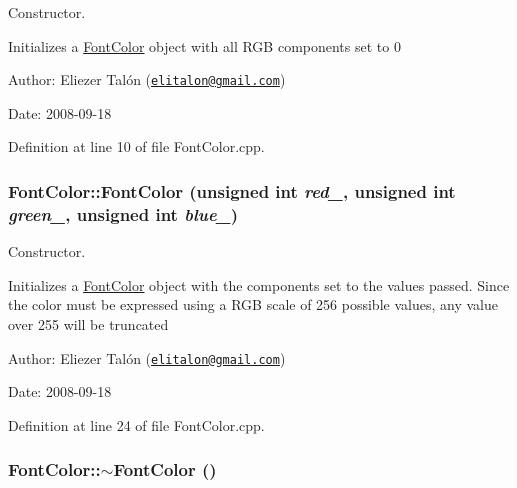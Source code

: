 Constructor. 

Initializes a \hyperlink{struct_font_color}{FontColor} object with all RGB components set to 0

\begin{Desc}
\item[Author:]Eliezer Talón (\href{mailto:elitalon@gmail.com}{\tt elitalon@gmail.com}) \end{Desc}
\begin{Desc}
\item[Date:]2008-09-18 \end{Desc}


Definition at line 10 of file FontColor.cpp.\hypertarget{struct_font_color_7ed65a063287bfa5ba792bd4d85c1b51}{
\subsubsection[FontColor]{\setlength{\rightskip}{0pt plus 5cm}FontColor::FontColor (unsigned int {\em red\_\-}, \/  unsigned int {\em green\_\-}, \/  unsigned int {\em blue\_\-})}}
\label{struct_font_color_7ed65a063287bfa5ba792bd4d85c1b51}


Constructor. 

Initializes a \hyperlink{struct_font_color}{FontColor} object with the components set to the values passed. Since the color must be expressed using a RGB scale of 256 possible values, any value over 255 will be truncated

\begin{Desc}
\item[Author:]Eliezer Talón (\href{mailto:elitalon@gmail.com}{\tt elitalon@gmail.com}) \end{Desc}
\begin{Desc}
\item[Date:]2008-09-18 \end{Desc}


Definition at line 24 of file FontColor.cpp.\hypertarget{struct_font_color_660917a7d04fdf47910573165f67cdaa}{
\subsubsection[$\sim$FontColor]{\setlength{\rightskip}{0pt plus 5cm}FontColor::$\sim$FontColor ()}}
\label{struct_font_color_660917a7d04fdf47910573165f67cdaa}


